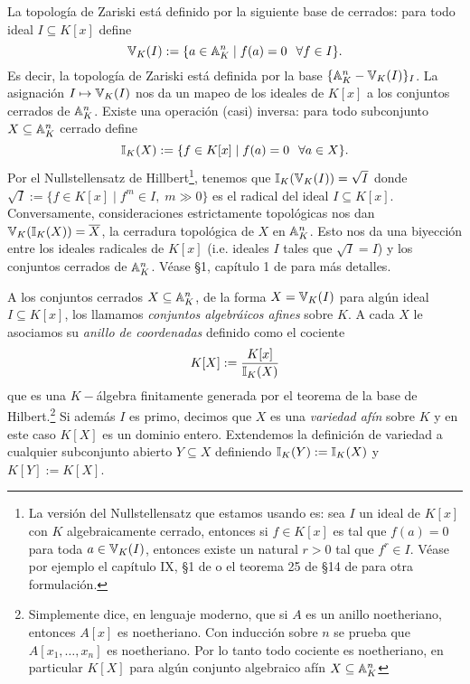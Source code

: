\begin{nota}
	La topología de Zariski está definido por la siguiente base de cerrados: para todo ideal $I\subseteq K[x]$ define
	\[
		\mathbb{V}_K(I):=\{a\in\mathbb{A}^n_K\mid f(a)=0\,\;\;\forall f\in I\}.
	\]
	Es decir, la topología de Zariski está definida por la base $\{\mathbb{A}^n_K-\mathbb{V}_K(I)\}_I$. La asignación $I\mapsto\mathbb{V}_K(I)$ nos da un mapeo de los ideales de $K[x]$ a los conjuntos cerrados de $\mathbb{A}^n_K$. Existe una operación (casi) inversa: para todo subconjunto $X\subseteq\mathbb{A}^n_K$ cerrado define
	\[
		\mathbb{I}_K(X):=\{f\in K[x]\mid f(a)=0\,\;\; \forall a\in X\}.
	\]
	Por el Nullstellensatz de Hillbert\footnote{La versión del Nullstellensatz que estamos usando es: sea $I$ un ideal de $K[x]$ con $K$ algebraicamente cerrado, entonces si $f\in K[x]$ es tal que $f(a)=0$ para toda $a\in\mathbb{V}_K(I)$, entonces existe un natural $r>0$ tal que $f^r\in I$. Véase por ejemplo el capítulo IX, \S1 de \cite{LangA} o el teorema 25 de \S14 de \cite{MatsumuraCA} para otra formulación.}, tenemos que $\mathbb{I}_K(\mathbb{V}_K(I))=\sqrt{I}$ donde $\sqrt{I}:=\{f\in K[x]\mid f^m\in I,\; m\gg 0\}$ es el radical del ideal $I\subseteq K[x]$. Conversamente, consideraciones estrictamente topológicas nos dan $\mathbb{V}_K(\mathbb{I}_K(X))=\overline{X}$, la cerradura topológica de $X$ en $\mathbb{A}^n_K$. Esto nos da una biyección entre los ideales radicales de $K[x]$ (i.e. ideales $I$ tales que $\sqrt{I}=I$) y los conjuntos cerrados de $\mathbb{A}^n_K$. Véase \S1, capítulo 1 de \cite{HartshorneAG} para más detalles.
\end{nota}

\begin{defin}
	A los conjuntos cerrados $X\subseteq\mathbb{A}^n_K$, de la forma $X=\mathbb{V}_K(I)$ para algún ideal $I\subseteq K[x]$, los llamamos \emph{conjuntos algebráicos afines} sobre $K$. A cada $X$ le asociamos su \emph{anillo de coordenadas} definido como el cociente
	\[
		K[X]:=\frac{K[x]}{\mathbb{I}_K(X)}
	\]
	que es una $K-$álgebra finitamente generada por el teorema de la base de Hilbert.\footnote{Simplemente dice, en lenguaje moderno, que si $A$ es un anillo noetheriano, entonces $A[x]$ es noetheriano. Con inducción sobre $n$ se prueba que $A[x_1,\ldots,x_n]$ es noetheriano. Por lo tanto todo cociente es noetheriano, en particular $K[X]$ para algún conjunto algebraico afín $X\subseteq\mathbb{A}^n_K$} Si además $I$ es primo, decimos que $X$ es una \emph{variedad afín} sobre $K$ y en este caso $K[X]$ es un dominio entero. Extendemos la definición de variedad a cualquier subconjunto abierto $Y\subseteq X$ definiendo $\mathbb{I}_K(Y):=\mathbb{I}_K(X)$ y $K[Y]:= K[X]$.
\end{defin}

